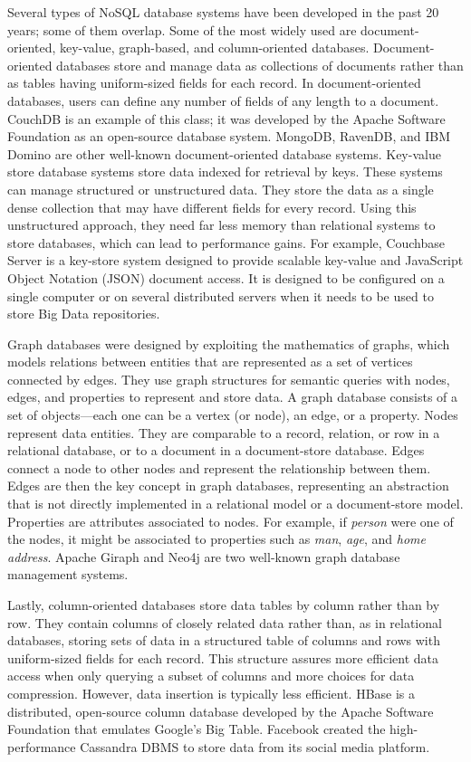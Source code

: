 Several types of NoSQL database systems have been developed in the past 20 years; some of them overlap. Some of the most widely used are document-oriented, key-value, graph-based, and column-oriented databases. Document-oriented databases store and manage data as collections of documents rather than as tables having uniform-sized fields for each record. In document-oriented databases, users can define any number of fields of any length to a document. CouchDB is an example of this class; it was developed by the Apache Software Foundation as an open-source database system. MongoDB, RavenDB, and IBM Domino are other well-known document-oriented database systems. Key-value store database systems store data indexed for retrieval by keys. These systems can manage structured or unstructured data. They store the data as a single dense collection that may have different fields for every record. Using this unstructured approach, they need far less memory than relational systems to store databases, which can lead to performance gains. For example, Couchbase Server is a key-store system designed to provide scalable key-value and JavaScript Object Notation (JSON) document access. It is designed to be configured on a single computer or on several distributed servers when it needs to be used to store Big Data repositories.

Graph databases were designed by exploiting the mathematics of graphs, which models relations between entities that are represented as a set of vertices connected by edges. They use graph structures for semantic queries with nodes, edges, and properties to represent and store data. A graph database consists of a set of objects---each one can be a vertex (or node), an edge, or a property. Nodes represent data entities. They are comparable to a record, relation, or row in a relational database, or to a document in a document-store database. Edges connect a node to other nodes and represent the relationship between them. Edges are then the key concept in graph databases, representing an abstraction that is not directly implemented in a relational model or a document-store model. Properties are attributes associated to nodes. For example, if \textit{person} were one of the nodes, it might be associated to properties such as \textit{man}, \textit{age}, and \textit{home address}. Apache Giraph and Neo4j are two well-known graph database management systems.

Lastly, column-oriented databases store data tables by column rather than by row. They contain columns of closely related data rather than, as in relational databases, storing sets of data in a structured table of columns and rows with uniform-sized fields for each record. This structure assures more efficient data access when only querying a subset of columns and more choices for data compression. However, data insertion is typically less efficient. HBase is a distributed, open-source column database developed by the Apache Software Foundation that emulates Google's Big Table. Facebook created the high-performance Cassandra DBMS to store data from its social media platform.

